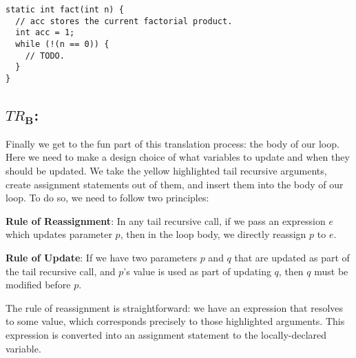 \begin{lstlisting}[language=MyJava]
static int fact(int n) {
  // acc stores the current factorial product. 
  int acc = 1;
  while (!(n == 0)) { 
    // TODO.
  }
}
\end{lstlisting}

\subsection{\emph{$TR_\mathbf{B}$}:} Finally we get to the fun part of this translation process: the body of our loop. Here we need to make a design choice of what variables to update and when they should be updated. We take the \textcolor{darkyellow}{yellow} highlighted tail recursive arguments, create assignment statements out of them, and insert them into the body of our loop. To do so, we need to follow two principles:

\textbf{Rule of Reassignment}: In any tail recursive call, if we pass an expression $e$ which updates parameter $p$, then in the loop body, we directly reassign $p$ to $e$.

\textbf{Rule of Update}: If we have two parameters $p$ and $q$ that are updated as part of the tail recursive call, and $p$'s value is used as part of updating $q$, then $q$ must be modified before $p$.

The rule of reassignment is straightforward: we have an expression that resolves to some value, which corresponds precisely to those highlighted arguments. This expression is converted into an assignment statement to the locally-declared variable. 

